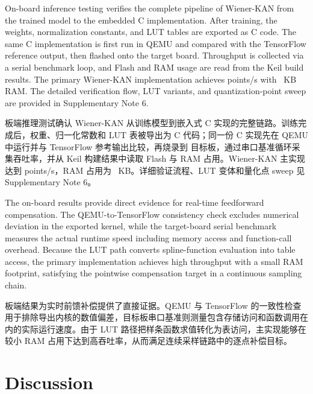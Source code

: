 \documentclass[sn-nature]{sn-jnl}
\newif\ifCNENEnglish
\newif\ifCNENBilingual
\newcommand{\CNEN}[2]{%
    \ifCNENBilingual
        #1%
        \if\relax\detokenize{#2}\relax\else\par #2\fi%
    \else
        \ifCNENEnglish
            #2%
        \else
            #1%
        \fi
    \fi
}
\begin{document}
\CNEN{板端推理测试确认 Wiener-KAN 从训练模型到嵌入式 C 实现的完整链路。训练完成后，权重、归一化常数和 LUT 表被导出为 C 代码；同一份 C 实现先在 QEMU 中运行并与 TensorFlow 参考输出比较，再烧录到 \valTargetMcu{} 目标板，通过串口基准循环采集吞吐率，并从 Keil 构建结果中读取 Flash 与 RAM 占用。Wiener-KAN 主实现达到 \valPrimaryKeilFps{} points/s，RAM 占用为 \valPrimaryKeilRamKB~KB。详细验证流程、LUT 变体和量化点 sweep 见 Supplementary Note 6。}{On-board inference testing verifies the complete pipeline of Wiener-KAN from the trained model to the embedded C implementation. After training, the weights, normalization constants, and LUT tables are exported as C code. The same C implementation is first run in QEMU and compared with the TensorFlow reference output, then flashed onto the \valTargetMcu{} target board. Throughput is collected via a serial benchmark loop, and Flash and RAM usage are read from the Keil build results. The primary Wiener-KAN implementation achieves \valPrimaryKeilFps{} points/s with \valPrimaryKeilRamKB~KB RAM. The detailed verification flow, LUT variants, and quantization-point sweep are provided in Supplementary Note 6.%
}
\FloatBarrier

\CNEN{板端结果为实时前馈补偿提供了直接证据。QEMU 与 TensorFlow 的一致性检查用于排除导出内核的数值偏差，目标板串口基准则测量包含存储访问和函数调用在内的实际运行速度。由于 LUT 路径把样条函数求值转化为表访问，主实现能够在较小 RAM 占用下达到高吞吐率，从而满足连续采样链路中的逐点补偿目标。}{The on-board results provide direct evidence for real-time feedforward compensation. The QEMU-to-TensorFlow consistency check excludes numerical deviation in the exported kernel, while the target-board serial benchmark measures the actual runtime speed including memory access and function-call overhead. Because the LUT path converts spline-function evaluation into table access, the primary implementation achieves high throughput with a small RAM footprint, satisfying the pointwise compensation target in a continuous sampling chain.}



\section{Discussion}
\end{document}
